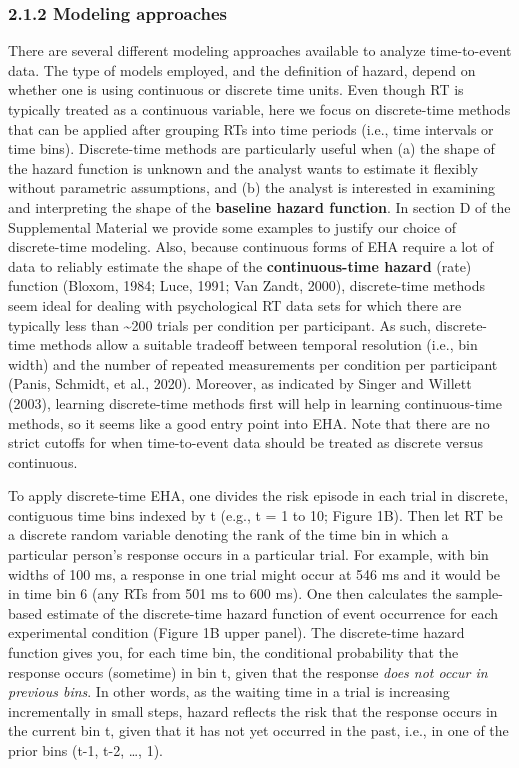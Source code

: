 \documentclass[
  english,
  man, donotrepeattitle,floatsintext]{apa6}
\begin{document}
\subsubsection{2.1.2 Modeling approaches}\label{modeling-approaches}

There are several different modeling approaches available to analyze time-to-event data. The type of models employed, and the definition of hazard, depend on whether one is using continuous or discrete time units. Even though RT is typically treated as a continuous variable, here we focus on discrete-time methods that can be applied after grouping RTs into time periods (i.e., time intervals or time bins). Discrete-time methods are particularly useful when (a) the shape of the hazard function is unknown and the analyst wants to estimate it flexibly without parametric assumptions, and (b) the analyst is interested in examining and interpreting the shape of the \textbf{baseline hazard function}. In section D of the Supplemental Material we provide some examples to justify our choice of discrete-time modeling.
Also, because continuous forms of EHA require a lot of data to reliably estimate the shape of the \textbf{continuous-time hazard} (rate) function (Bloxom, 1984; Luce, 1991; Van Zandt, 2000), discrete-time methods seem ideal for dealing with psychological RT data sets for which there are typically less than \textasciitilde200 trials per condition per participant.
As such, discrete-time methods allow a suitable tradeoff between temporal resolution (i.e., bin width) and the number of repeated measurements per condition per participant (Panis, Schmidt, et al., 2020).
Moreover, as indicated by Singer and Willett (2003), learning discrete-time methods first will help in learning continuous-time methods, so it seems like a good entry point into EHA. Note that there are no strict cutoffs for when time-to-event data should be treated as discrete versus continuous.

To apply discrete-time EHA, one divides the risk episode in each trial in discrete, contiguous time bins indexed by t (e.g., t = 1 to 10; Figure 1B).
Then let RT be a discrete random variable denoting the rank of the time bin in which a particular person's response occurs in a particular trial.
For example, with bin widths of 100 ms, a response in one trial might occur at 546 ms and it would be in time bin 6 (any RTs from 501 ms to 600 ms).
One then calculates the sample-based estimate of the discrete-time hazard function of event occurrence for each experimental condition (Figure 1B upper panel).
The discrete-time hazard function gives you, for each time bin, the conditional probability that the response occurs (sometime) in
bin t, given that the response \emph{does not occur in previous bins}.
In other words, as the waiting time in a trial is increasing incrementally in small steps, hazard reflects the risk that the response occurs in the current bin t, given that it has not yet
occurred in the past, i.e., in one of the prior bins (t-1, t-2, \ldots, 1).
\end{document}
